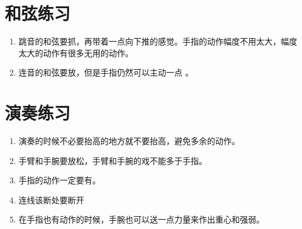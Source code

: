 \documentclass[UTF8]{ctexart}
\begin{document}
\section{和弦练习}

\begin{enumerate}
    \item 跳音的和弦要抓，再带着一点向下推的感觉。手指的动作幅度不用太大，幅度太大的动作有很多无用的动作。 
    \item 连音的和弦要放，但是手指仍然可以主动一点 。
\end{enumerate}

\section{演奏练习}

\begin{enumerate}
    \item 演奏的时候不必要抬高的地方就不要抬高，避免多余的动作。 
    \item 手臂和手腕要放松，手臂和手腕的戏不能多于手指。
    \item 手指的动作一定要有。
    \item 连线该断处要断开
    \item 在手指也有动作的时候，手腕也可以送一点力量来作出重心和强弱。
\end{enumerate}
\end{document}
